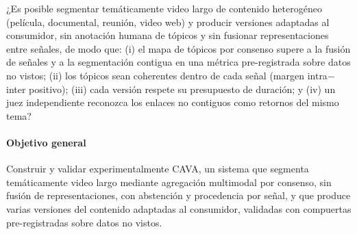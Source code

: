 
¿Es posible segmentar temáticamente video largo de contenido heterogéneo (película,
documental, reunión, video web) y producir versiones adaptadas al consumidor, sin anotación
humana de tópicos y sin fusionar representaciones entre señales, de modo que:
(i) el mapa de tópicos por consenso supere a la fusión de señales y a la segmentación
contigua en una métrica pre-registrada sobre datos no vistos;
(ii) los tópicos sean coherentes dentro de cada señal (margen intra$-$inter positivo);
(iii) cada versión respete su presupuesto de duración; y
(iv) un juez independiente reconozca los enlaces no contiguos como retornos del mismo tema?


\paragraph{Objetivo general}
Construir y validar experimentalmente CAVA, un sistema que segmenta temáticamente video largo
mediante agregación multimodal por consenso, sin fusión de representaciones, con abstención y
procedencia por señal, y que produce varias versiones del contenido adaptadas al consumidor,
validadas con compuertas pre-registradas sobre datos no vistos.

